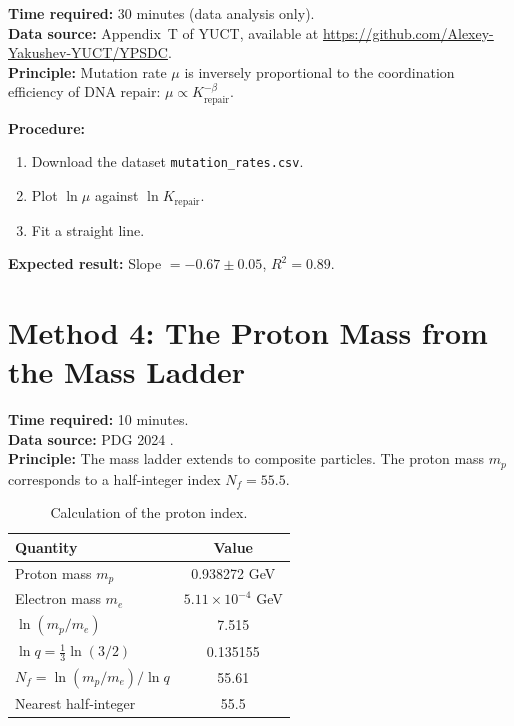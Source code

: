 \documentclass[12pt,a4paper]{article}
\begin{document}
	\textbf{Time required:} 30 minutes (data analysis only).\\
	\textbf{Data source:} Appendix~T of YUCT, available at
	\url{https://github.com/Alexey-Yakushev-YUCT/YPSDC}.\\
	\textbf{Principle:} Mutation rate \(\mu\) is inversely proportional to
	the coordination efficiency of DNA repair: \(\mu \propto K_{\text{repair}}^{-\beta}\).
	
	\textbf{Procedure:}
	\begin{enumerate}[label=(\arabic*)]
		\item Download the dataset \texttt{mutation\_rates.csv}.
		\item Plot \(\ln \mu\) against \(\ln K_{\text{repair}}\).
		\item Fit a straight line.
	\end{enumerate}
	
	\textbf{Expected result:} Slope \(= -0.67 \pm 0.05\), \(R^2 = 0.89\).
	
	\section{Method 4: The Proton Mass from the Mass Ladder}
	\label{sec:proton}
	
	\textbf{Time required:} 10 minutes.\\
	\textbf{Data source:} PDG 2024 \cite{PDG2024}.\\
	\textbf{Principle:} The mass ladder extends to composite particles.
	The proton mass \(m_p\) corresponds to a half‑integer index
	\(N_f = 55.5\).
	
	\begin{table}[H]
		\centering
		\caption{Calculation of the proton index.}
		\label{tab:proton}
		\begin{tabular}{l c}
			\toprule
			Quantity & Value \\
			\midrule
			Proton mass \(m_p\) & 0.938272 GeV \\
			Electron mass \(m_e\) & \(5.11\times10^{-4}\) GeV \\
			\(\ln(m_p/m_e)\) & 7.515 \\
			\(\ln q = \frac{1}{3}\ln(3/2)\) & 0.135155 \\
			\(N_f = \ln(m_p/m_e)/\ln q\) & 55.61 \\
			Nearest half‑integer & 55.5 \\
			\bottomrule
		\end{tabular}
	\end{table}
	
\end{document}
